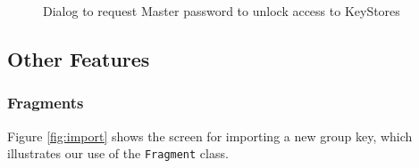 \begin{figure}[h!]
                                                                                                                                                                                                                                                                                                                                                                                                                            
    \caption{Dialog to request Master password to unlock access to KeyStores }
    \label{fig:unlock}
\end{figure}

\subsection*{Other Features}

\subsubsection*{Fragments}

Figure \ref{fig:import} shows the screen for importing a new group key, which illustrates our use of the \texttt{Fragment} class.  

